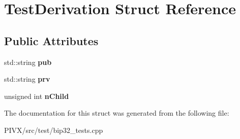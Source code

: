 \hypertarget{struct_test_derivation}{}\section{Test\+Derivation Struct Reference}
\label{struct_test_derivation}
\subsection*{Public Attributes}
\begin{DoxyCompactItemize}
\item 
\mbox{\label{struct_test_derivation_afe34283feddc4ce6a942761a361d31a0}} 
std\+::string {\bfseries pub}
\item 
\mbox{\label{struct_test_derivation_a9789eba10131e5ec5680060c47e3daa7}} 
std\+::string {\bfseries prv}
\item 
\mbox{\label{struct_test_derivation_ac48b24762134f580bc8192337ddbd8eb}} 
unsigned int {\bfseries n\+Child}
\end{DoxyCompactItemize}


The documentation for this struct was generated from the following file\+:\begin{DoxyCompactItemize}
\item 
P\+I\+V\+X/src/test/bip32\+\_\+tests.\+cpp\end{DoxyCompactItemize}
